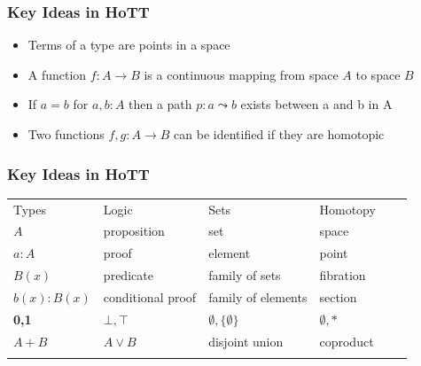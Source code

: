 \documentclass{beamer}
\begin{document}
\begin{frame}
\frametitle{Key Ideas in HoTT}
\begin{itemize}
\item Terms of a type are points in a space
\item A function $ f : A \to B $ is a continuous mapping from space $ A $ to space $ B $
\item If $a = b$ for $a,b : A$ then a path $ p : a \leadsto b $ exists between a and b in A
\item Two functions $ f,g : A \to B $ can be identified if they are homotopic
\end{itemize}

\end{frame}


\begin{frame}
\frametitle{Key Ideas in HoTT}

\begin{table}
\begin{tabular}{l l l l l l}
\toprule
Types & Logic & Sets & Homotopy\\ \addlinespace[2pt]
\midrule
$A$ & proposition & set & space\\ \addlinespace[2pt]
$a:A$ & proof & element & point \\ \addlinespace[2pt]
$B(x)$ & predicate & family of sets & fibration \\ \addlinespace[2pt]
$b(x) : B(x)$ & conditional proof & family of elements & section\\ \addlinespace[2pt]
\textbf{0,1} & $\bot, \top$ & $\emptyset, \{ \emptyset \}$ & $\emptyset, *$\\ \addlinespace[2pt]
$A + B$ & $A\vee B$ & disjoint union & coproduct\\ \addlinespace[2pt]
\bottomrule
\end{tabular}
\end{table}
\end{frame}

\end{document}
